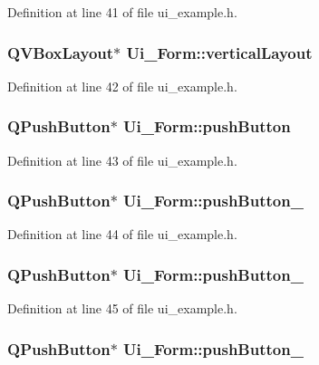 Definition at line 41 of file ui\_\-example.h.\hypertarget{classUi__Form_292f20c0af9f15fa4da52b031b12eee1}{
\subsubsection{\setlength{\rightskip}{0pt plus 5cm}QVBoxLayout$\ast$ {\bf Ui\_\-Form::verticalLayout}}}
\label{classUi__Form_292f20c0af9f15fa4da52b031b12eee1}




Definition at line 42 of file ui\_\-example.h.\hypertarget{classUi__Form_283dc0cdd4294e215c6995077b7d75e3}{
\subsubsection{\setlength{\rightskip}{0pt plus 5cm}QPushButton$\ast$ {\bf Ui\_\-Form::pushButton}}}
\label{classUi__Form_283dc0cdd4294e215c6995077b7d75e3}




Definition at line 43 of file ui\_\-example.h.\hypertarget{classUi__Form_633cc8e4e55d8ed211f30f3c21d3651a}{
\subsubsection{\setlength{\rightskip}{0pt plus 5cm}QPushButton$\ast$ {\bf Ui\_\-Form::pushButton\_}}}
\label{classUi__Form_633cc8e4e55d8ed211f30f3c21d3651a}




Definition at line 44 of file ui\_\-example.h.\hypertarget{classUi__Form_1c8c527c351aa3ecb2b234e1fc300284}{
\subsubsection{\setlength{\rightskip}{0pt plus 5cm}QPushButton$\ast$ {\bf Ui\_\-Form::pushButton\_}}}
\label{classUi__Form_1c8c527c351aa3ecb2b234e1fc300284}




Definition at line 45 of file ui\_\-example.h.\hypertarget{classUi__Form_bb7ba76408930a3b6afba9a7d21dcd96}{
\subsubsection{\setlength{\rightskip}{0pt plus 5cm}QPushButton$\ast$ {\bf Ui\_\-Form::pushButton\_}}}
\label{classUi__Form_bb7ba76408930a3b6afba9a7d21dcd96}




